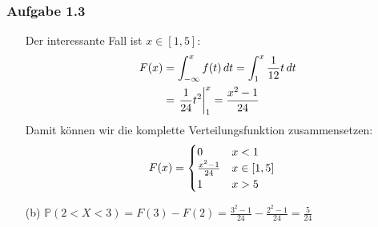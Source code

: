 \documentclass[ngerman,t]{beamer}
\begin{document}
	\begin{frame}
		\frametitle{Aufgabe 1.3}
		\begin{itemize}
			\item[] Der interessante Fall ist $x\in [1,5]$:
			\begin{align}
				F(x) &= \int_{-\infty}^x f(t)\, dt = \int_{1} ^x \frac{1}{12}t\, dt \notag \\
				&= \left.\frac{1}{24}t^2\right\vert_1^x = \frac{x^2 - 1}{24} \notag
			\end{align}
			\pause
			Damit können wir die komplette Verteilungsfunktion zusammensetzen:
			\begin{align}
				F(x) &= \begin{cases}
					0 & x<1 \\
					\frac{x^2-1}{24} &x\in [1,5] \\
					1 & x>5
				\end{cases} \notag
			\end{align}
			\pause
			\item[(b)] $\mathbb{P}(2<X<3) = F(3) - F(2) = \frac{3^2-1}{24} - \frac{2^2-1}{24} = \frac{5}{24}$
		\end{itemize}
	\end{frame}
\end{document}

